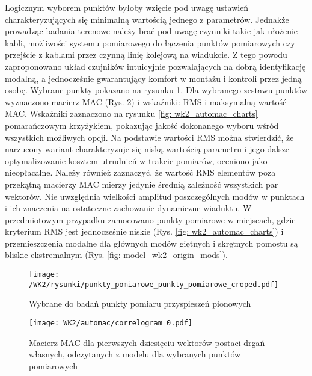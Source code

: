 Logicznym wyborem punktów byłoby wzięcie pod uwagę ustawień charakteryzujących się minimalną wartością jednego z parametrów. Jednakże prowadząc badania terenowe należy brać pod uwagę czynniki takie jak ułożenie kabli, możliwości systemu pomiarowego do łączenia punktów pomiarowych czy przejście z kablami przez czynną linię kolejową na wiadukcie. Z tego powodu zaproponowano układ czujników intuicyjnie pozwalających na dobrą identyfikację modalną, a jednocześnie gwarantujący komfort w montażu i kontroli przez jedną osobę. Wybrane punkty pokazano na rysunku \ref{fig: wk2_automac_points_choosen}. Dla wybranego zestawu punktów wyznaczono macierz MAC (Rys. \ref{fig: wk2_automac_correlogram}) i wskaźniki: RMS i maksymalną wartość MAC. Wskaźniki zaznaczono na rysunku \ref{fig: wk2_automac_charts} pomarańczowym krzyżykiem, pokazując jakość dokonanego wyboru wśród wszystkich możliwych opcji. Na podstawie wartości RMS można stwierdzić, że narzucony wariant charakteryzuje się niską wartością parametru i jego dalsze optymalizowanie kosztem utrudnień w trakcie pomiarów, oceniono jako nieopłacalne. Należy również zaznaczyć, że wartość RMS elementów poza przekątną macierzy MAC mierzy jedynie średnią zależność wszystkich par wektorów. Nie uwzględnia wielkości amplitud poszczególnych modów w punktach i ich znaczenia na ostateczne zachowanie dynamiczne wiaduktu. W przedmiotowym przypadku zamocowano punkty pomiarowe w miejscach, gdzie kryterium RMS jest jednocześnie niskie (Rys. \ref{fig: wk2_automac_charts}) i przemieszczenia modalne dla głównych modów giętnych i skrętnych pomostu są bliskie ekstremalnym (Rys. \ref{fig: model_wk2_origin_mods}).


\begin{figure}[hbt!]
	\centering
	\texttt{[image: /WK2/rysunki/punkty\_pomiarowe\_punkty\_pomiarowe\_croped.pdf]}
	\captionsetup{justification=centering}
	\caption{Wybrane do badań punkty pomiaru przyspieszeń pionowych}
	\label{fig: wk2_automac_points_choosen}
\end{figure}


\begin{figure}[hbt!]
	\centering
	\texttt{[image: WK2/automac/correlogram\_0.pdf]}
	\captionsetup{justification=centering}
	\caption{Macierz MAC dla pierwszych dziesięciu wektorów postaci drgań własnych, odczytanych z modelu dla wybranych punktów pomiarowych}
	\label{fig: wk2_automac_correlogram}
\end{figure}


